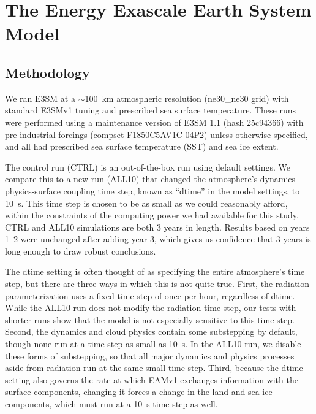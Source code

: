 \documentclass [11pt, proquest] {uwthesis}[2020/02/24]
\begin{document}
\chapter{The Energy Exascale Earth System Model}

\section{Methodology}

We ran E3SM at a $\sim$\SI{100}{\kilo\meter} atmospheric resolution (ne30\_ne30 grid) with standard E3SMv1 tuning and prescribed sea surface temperature. These runs were performed using a maintenance version of E3SM 1.1 (hash 25c94366) with pre-industrial forcings (compset F1850C5AV1C-04P2) unless otherwise specified, and all had prescribed sea surface temperature (SST) and sea ice extent.

The control run (CTRL) is an out-of-the-box run using default settings. We compare this to a new run (ALL10) that changed the atmosphere's dynamics-physics-surface coupling time step, known as ``dtime'' in the model settings, to \SI{10}{\second}. This time step is chosen to be as small as we could reasonably afford, within the constraints of the computing power we had available for this study. CTRL and ALL10 simulations are both \num{3} years in length. Results based on years \numrange{1}{2} were unchanged after adding year \num{3}, which gives us confidence that \num{3} years is long enough to draw robust conclusions.

The dtime setting is often thought of as specifying the entire atmosphere's time step, but there are three ways in which this is not quite true. First, the radiation parameterization uses a fixed time step of once per hour, regardless of dtime. While the ALL10 run does not modify the radiation time step, our tests with shorter runs show that the model is not especially sensitive to this time step. Second, the dynamics and cloud physics contain some substepping by default, though none run at a time step as small as \SI{10}{\second}. In the ALL10 run, we disable these forms of substepping, so that all major dynamics and physics processes aside from radiation run at the same small time step. Third, because the dtime setting also governs the rate at which EAMv1 exchanges information with the surface components, changing it forces a change in the land and sea ice components, which must run at a \SI{10}{\second} time step as well.
\end{document}
